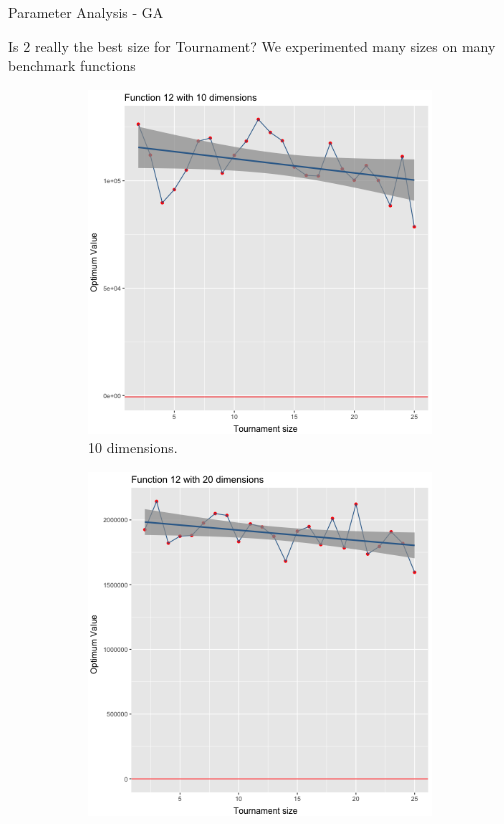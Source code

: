 \documentclass[10pt]{beamer}
\begin{document}
\begin{frame}{Parameter Analysis - GA}
	\begin{alertblock}{Is $2$ really the best size for Tournament?}	
		We experimented many sizes on many benchmark functions
	\end{alertblock}
\begin{figure}
	\begin{subfigure}[b]{0.3\textwidth}
		\centering
		\includegraphics[width=\textwidth]{12dim_10.png}
		\caption{10 dimensions.}
	\end{subfigure}
	\begin{subfigure}[b]{0.3\textwidth}
		\centering
		\includegraphics[width=\textwidth]{12dim_20.png}

\end{subfigure}
\end{figure}
\end{frame}
\end{document}
